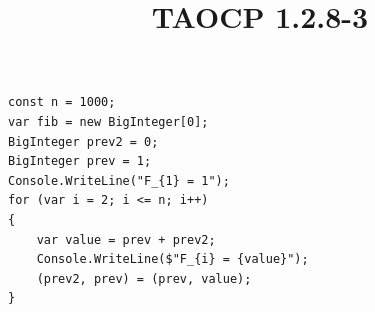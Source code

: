 \documentclass{article}
\title{TAOCP 1.2.8\mbox{-}3}
\begin{document}
\maketitle

\begin{verbatim}
const n = 1000;
var fib = new BigInteger[0];
BigInteger prev2 = 0;
BigInteger prev = 1;
Console.WriteLine("F_{1} = 1");
for (var i = 2; i <= n; i++)
{
    var value = prev + prev2;
    Console.WriteLine($"F_{i} = {value}");
    (prev2, prev) = (prev, value);
}
\end{verbatim}
\end{document}
